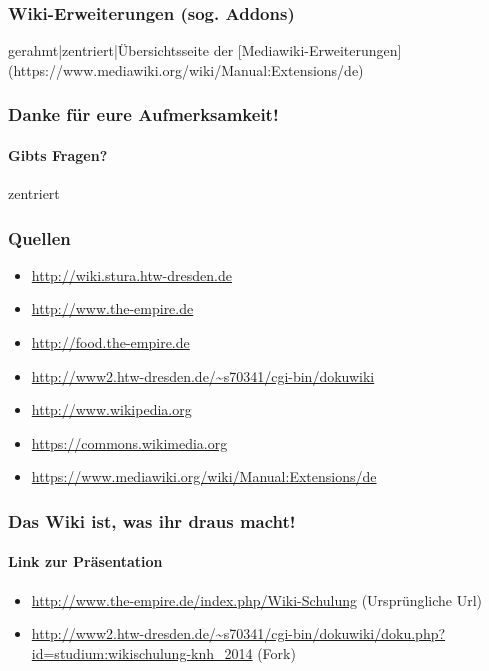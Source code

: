 \documentclass{beamer}
\begin{document}
\begin{frame}
  \frametitle{Wiki-Erweiterungen (sog. Addons)}

  gerahmt|zentriert|Übersichtsseite der [Mediawiki-Erweiterungen](https://www.mediawiki.org/wiki/Manual:Extensions/de)

\end{frame}


\begin{frame}
  \frametitle{Danke für eure Aufmerksamkeit!}
  \framesubtitle{Gibts Fragen?}

  zentriert

\end{frame}


\begin{frame}
  \frametitle{Quellen}
  \begin{itemize}
    \item \url{http://wiki.stura.htw-dresden.de}
    \item \url{http://www.the-empire.de}
    \item \url{http://food.the-empire.de}
    \item \url{http://www2.htw-dresden.de/~s70341/cgi-bin/dokuwiki}
    \item \url{http://www.wikipedia.org}
    \item \url{https://commons.wikimedia.org}
    \item \url{https://www.mediawiki.org/wiki/Manual:Extensions/de}
  \end{itemize}
\end{frame}

\begin{frame}
  \frametitle{Das Wiki ist, was ihr draus macht!}
  \framesubtitle{Link zur Präsentation}
  \begin{itemize}
    \item \url{http://www.the-empire.de/index.php/Wiki-Schulung} (Ursprüngliche Url)
    \item \url{http://www2.htw-dresden.de/~s70341/cgi-bin/dokuwiki/doku.php?id=studium:wikischulung-knh_2014} (Fork)
  \end{itemize}
\end{frame}
\end{document}
